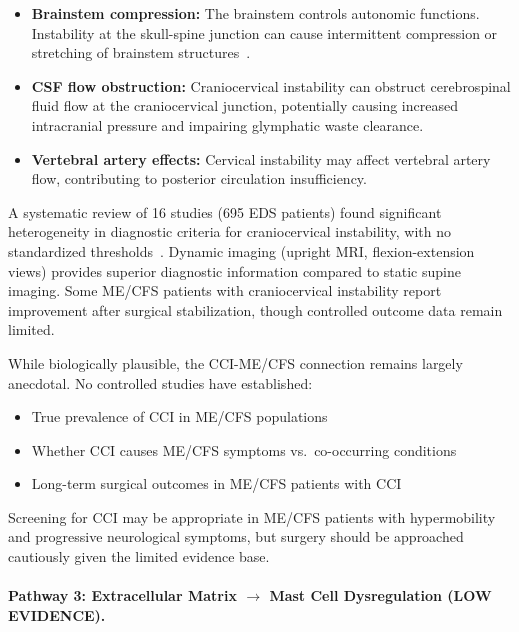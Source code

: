 \begin{itemize}
    \item \textbf{Brainstem compression:} The brainstem controls autonomic functions. Instability at the skull-spine junction can cause intermittent compression or stretching of brainstem structures~\cite{Milhorat2007}.

    \item \textbf{CSF flow obstruction:} Craniocervical instability can obstruct cerebrospinal fluid flow at the craniocervical junction, potentially causing increased intracranial pressure and impairing glymphatic waste clearance.

    \item \textbf{Vertebral artery effects:} Cervical instability may affect vertebral artery flow, contributing to posterior circulation insufficiency.
\end{itemize}

A systematic review of 16 studies (695 EDS patients) found significant heterogeneity in diagnostic criteria for craniocervical instability, with no standardized thresholds~\cite{Lohkamp2022cci}. Dynamic imaging (upright MRI, flexion-extension views) provides superior diagnostic information compared to static supine imaging. Some ME/CFS patients with craniocervical instability report improvement after surgical stabilization, though controlled outcome data remain limited.

\begin{warning}
While biologically plausible, the CCI-ME/CFS connection remains largely anecdotal. No controlled studies have established:
\begin{itemize}
    \item True prevalence of CCI in ME/CFS populations
    \item Whether CCI causes ME/CFS symptoms vs.\ co-occurring conditions
    \item Long-term surgical outcomes in ME/CFS patients with CCI
\end{itemize}
Screening for CCI may be appropriate in ME/CFS patients with hypermobility and progressive neurological symptoms, but surgery should be approached cautiously given the limited evidence base.
\end{warning}

\paragraph{Pathway 3: Extracellular Matrix $\rightarrow$ Mast Cell Dysregulation (LOW EVIDENCE).}

